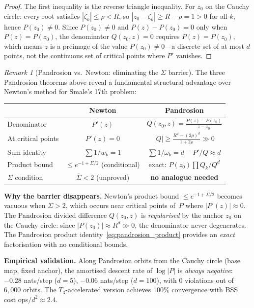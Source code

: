 \documentclass[10pt,a4paper,oneside]{book}
\theoremstyle{definition}
\theoremstyle{remark}
\newtheorem{remark}[theorem]{Remark}
\begin{document}
\begin{proof}
The first inequality is the reverse triangle inequality.  For $z_0$ on the Cauchy circle: every root satisfies $|\zeta_k| \leq \rho < R$, so $|z_0 - \zeta_k| \geq R - \rho = 1 > 0$ for all $k$, hence $P(z_0) \neq 0$.  Since $P(z_0) \neq 0$ and $P(z) - P(z_0) = 0$ only when $P(z) = P(z_0)$, the denominator $Q(z_0,z) = 0$ requires $P(z) = P(z_0)$, which means $z$ is a preimage of the value $P(z_0) \neq 0$---a discrete set of at most $d$ points, not the continuous set of critical points where $P'$ vanishes.
\end{proof}

\begin{remark}[Pandrosion vs.\ Newton: eliminating the $\Sigma$ barrier]
\label{rem:pandrosion_vs_newton}
The three Pandrosion theorems above reveal a fundamental structural advantage over Newton's method for Smale's 17th problem:

\begin{center}
\renewcommand{\arraystretch}{1.3}
\begin{tabular}{lcc}
\toprule
& \textbf{Newton} & \textbf{Pandrosion} \\
\midrule
Denominator       & $P'(z)$    & $Q(z_0,z) = \frac{P(z)-P(z_0)}{z-z_0}$ \\
At critical points & $P'(z)=0$ & $|Q| \geq \frac{R^d-(2\rho)^d}{1+2\rho} \gg 0$ \\
Sum identity      & $\sum 1/w_k = 1$ & $\sum 1/\omega_k = d - P'/Q \approx d$ \\
Product bound     & $\leq e^{-1+\Sigma/2}$ (conditional) & exact: $P(z_0)\prod Q_k/Q^d$ \\
$\Sigma$ condition & $\overline{\Sigma}<2$ (unproved) & \textbf{no analogue needed} \\
\bottomrule
\end{tabular}
\end{center}

\medskip
\noindent\textbf{Why the barrier disappears.}
Newton's product bound $\leq e^{-1+\Sigma/2}$ becomes vacuous when $\Sigma > 2$, which occurs near critical points of~$P$ where $|P'(z)| \approx 0$.  The Pandrosion divided difference $Q(z_0,z)$ is \emph{regularised} by the anchor $z_0$ on the Cauchy circle: since $|P(z_0)| \approx R^d \gg 0$, the denominator never degenerates.  The Pandrosion product identity~\eqref{eq:pandrosion_product} provides an \emph{exact} factorisation with no conditional bounds.

\medskip
\noindent\textbf{Empirical validation.}
Along Pandrosion orbits from the Cauchy circle (base map, fixed anchor), the amortised descent rate of $\log|P|$ is \emph{always negative}: $-0.28$ nats/step ($d=5$), $-0.06$ nats/step ($d=100$), with $0$ violations out of $6{,}000$ orbits.  The $T_3$-accelerated version achieves $100\%$ convergence with BSS cost ops$/d^2 \approx 2.4$.
\end{remark}
\end{document}

